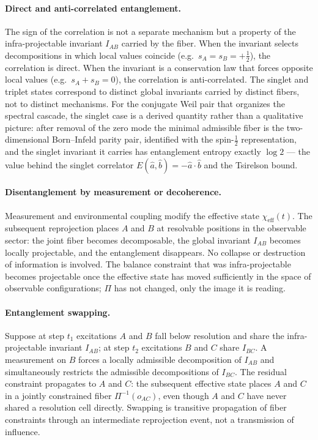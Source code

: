   \paragraph{Direct and anti-correlated entanglement.}
    The sign of the correlation is not a separate mechanism but a property of
    the infra-projectable invariant $I_{AB}$ carried by the fiber.
    When the invariant selects decompositions in which local values coincide
    (e.g.\ $s_A = s_B = +\tfrac{1}{2}$), the correlation is direct.
    When the invariant is a conservation law that forces opposite local values
    (e.g.\ $s_A + s_B = 0$), the correlation is anti-correlated.
    The singlet and triplet states correspond to distinct global invariants
    carried by distinct fibers, not to distinct mechanisms.
    For the conjugate Weil pair that organizes the spectral cascade, the singlet
    case is a derived quantity rather than a qualitative picture: after removal
    of the zero mode the minimal admissible fiber is the two-dimensional
    Born--Infeld parity pair, identified with the spin-$\tfrac{1}{2}$
    representation, and the singlet invariant it carries has entanglement entropy
    exactly $\log 2$ --- the value behind the singlet correlator
    $E(\hat{a},\hat{b}) = -\hat{a}\cdot\hat{b}$ and the Tsirelson bound.

  \paragraph{Disentanglement by measurement or decoherence.}
    Measurement and environmental coupling modify the effective state
    $\chi_{\mathrm{eff}}(t)$.
    The subsequent reprojection places $A$ and $B$ at resolvable positions in
    the observable sector: the joint fiber becomes decomposable, the global
    invariant $I_{AB}$ becomes locally projectable, and the entanglement
    disappears.
    No collapse or destruction of information is involved.
    The balance constraint that was infra-projectable becomes projectable once
    the effective state has moved sufficiently in the space of observable
    configurations; $\Pi$ has not changed, only the image it is reading.

  \paragraph{Entanglement swapping.}
    Suppose at step $t_1$ excitations $A$ and $B$ fall below resolution and
    share the infra-projectable invariant $I_{AB}$; at step $t_2$ excitations
    $B$ and $C$ share $I_{BC}$.
    A measurement on $B$ forces a locally admissible decomposition of $I_{AB}$
    and simultaneously restricts the admissible decompositions of $I_{BC}$.
    The residual constraint propagates to $A$ and $C$: the subsequent effective
    state places $A$ and $C$ in a jointly constrained fiber $\Pi^{-1}(o_{AC})$,
    even though $A$ and $C$ have never shared a resolution cell directly.
    Swapping is transitive propagation of fiber constraints through an
    intermediate reprojection event, not a transmission of influence.

